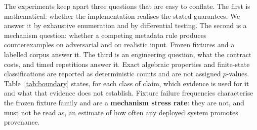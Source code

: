 \documentclass[preprint,3p,11pt,authoryear]{elsarticle}
\begin{document}
The experiments keep apart three questions that are easy to conflate. The first
is mathematical: whether the implementation realises the stated guarantees. We
answer it by exhaustive enumeration and by differential testing. The second is a
mechanism question: whether a competing metadata rule produces counterexamples
on adversarial and on realistic input. Frozen fixtures and a labelled corpus
answer it. The third is an engineering question, what the contract costs, and
timed repetitions answer it.
Exact algebraic properties and finite-state classifications are reported as
deterministic counts and are not assigned $p$-values.
Table~\ref{tab:boundary} states, for each class of claim, which evidence is
used for it and what that evidence does not establish. Fixture failure
frequencies characterise the frozen fixture family and are a \textbf{mechanism
stress rate}: they are not, and must not be read as, an estimate of how often
any deployed system promotes provenance.
\end{document}
